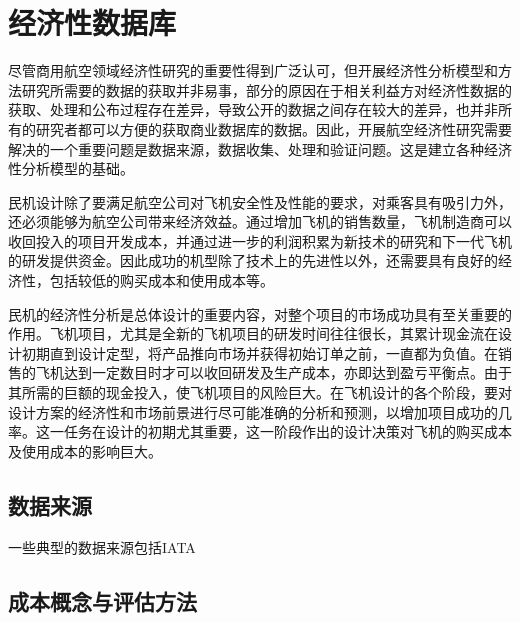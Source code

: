 \chapter{经济性数据库}\label{database}

尽管商用航空领域经济性研究的重要性得到广泛认可，但开展经济性分析模型和方法研究所需要的数据的获取并非易事，部分的原因在于相关利益方对经济性数据的获取、处理和公布过程存在差异，导致公开的数据之间存在较大的差异，也并非所有的研究者都可以方便的获取商业数据库的数据。因此，开展航空经济性研究需要解决的一个重要问题是数据来源，数据收集、处理和验证问题。这是建立各种经济性分析模型的基础。


民机设计除了要满足航空公司对飞机安全性及性能的要求，对乘客具有吸引力外，还必须能够为航空公司带来经济效益。通过增加飞机的销售数量，飞机制造商可以收回投入的项目开发成本，并通过进一步的利润积累为新技术的研究和下一代飞机的研发提供资金。因此成功的机型除了技术上的先进性以外，还需要具有良好的经济性，包括较低的购买成本和使用成本等。

民机的经济性分析是总体设计的重要内容，对整个项目的市场成功具有至关重要的作用。飞机项目，尤其是全新的飞机项目的研发时间往往很长，其累计现金流在设计初期直到设计定型，将产品推向市场并获得初始订单之前，一直都为负值。在销售的飞机达到一定数目时才可以收回研发及生产成本，亦即达到盈亏平衡点。由于其所需的巨额的现金投入，使飞机项目的风险巨大。在飞机设计的各个阶段，要对设计方案的经济性和市场前景进行尽可能准确的分析和预测，以增加项目成功的几率。这一任务在设计的初期尤其重要，这一阶段作出的设计决策对飞机的购买成本及使用成本的影响巨大。

\section{数据来源}

一些典型的数据来源包括IATA

\section{成本概念与评估方法}

